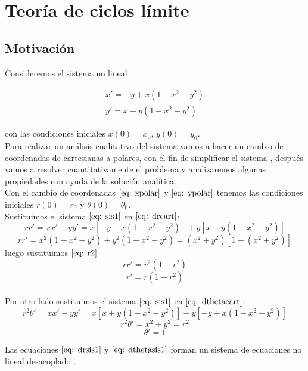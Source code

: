\chapter{Teoría de ciclos límite}
\section{Motivación}

Consideremos el sistema no lineal

\begin{equation}\label{eq: sis1}
	\begin{matrix}
		x'=-y+x(1-x^2-y^2) \\
		y'=x+y(1-x^2-y^2)
	\end{matrix}
\end{equation}

con las condiciones iniciales $x(0)=x_0$, $y(0)=y_0$.\\

Para realizar un análisis cualitativo del sistema vamos a hacer un cambio
de coordenadas de cartesianas a polares, con el fin de simplificar
el sistema \cite{perko2001differential}, después vamos a resolver cuantitativamente el problema y
analizaremos algunas propiedades con ayuda de la solución analítica.\\

Con el cambio de coordenadas $\eqref{eq: xpolar}$ y  $\eqref{eq: ypolar}$ tenemos
las condiciones iniciales $r(0)=r_0$ y $\theta(0)=\theta_0$.\\

Sustituimos el sistema $\eqref{eq: sis1}$ en $\eqref{eq: drcart}$:
$$rr'=xx'+yy'=x[-y+x(1-x^2-y^2)]+y[x+y(1-x^2-y^2)]$$
$$rr'=x^2(1-x^2-y^2)+y^2(1-x^2-y^2)=(x^2+y^2)[1-(x^2+y^2)]$$
luego sustituimos $\eqref{eq: r2}$
$$rr'=r^2(1-r^2)$$
\begin{equation}\label{eq: drsis1}
	r'=r(1-r^2)
\end{equation}\\

Por otro lado sustituimos el sistema $\eqref{eq: sis1}$ en $\eqref{eq: dthetacart}$:
$$r^2\theta'=xx'-yy'=x[x+y(1-x^2-y^2)]-y[-y+x(1-x^2-y^2)]$$
$$r^2\theta'=x^2+y^2=r^2$$
\begin{equation}\label{eq: dthetasis1}
	\theta'=1
\end{equation}

Las ecuaciones $\eqref{eq: drsis1}$ y $\eqref{eq: dthetasis1}$
forman un sistema de ecuaciones no lineal desacoplado \cite{strogatz2018nonlinear}.\\

